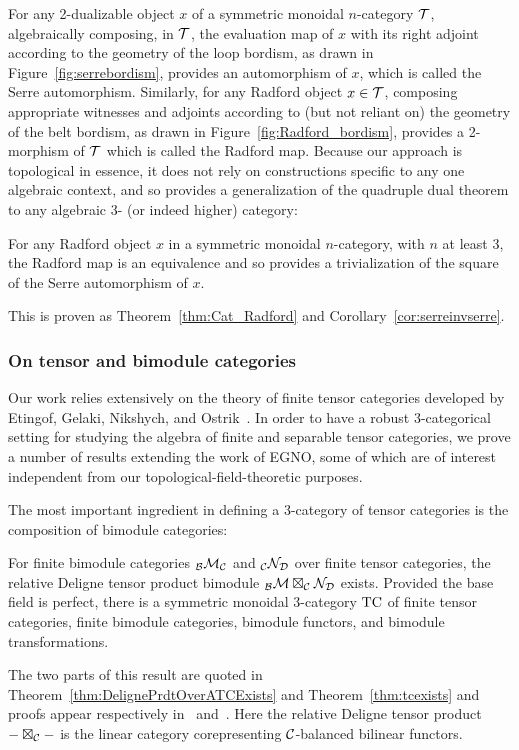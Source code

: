 \documentclass{amsart}
\begin{document}
For any 2-dualizable object $x$ of a symmetric monoidal $n$-category $\mathcal T$, algebraically composing, in $\mathcal T$, the evaluation map of $x$ with its right adjoint according to the geometry of the loop bordism, as drawn in Figure~\ref{fig:serrebordism}, provides an automorphism of $x$, which is called the Serre automorphism.  Similarly, for any Radford object $x \in \mathcal T$, composing appropriate witnesses and adjoints according to (but not reliant on) the geometry of the belt bordism, as drawn in Figure~\ref{fig:Radford_bordism}, provides a 2-morphism of $\mathcal T$ which is called the Radford map.  Because our approach is topological in essence, it does not rely on constructions specific to any one algebraic context, and so provides a generalization of the quadruple dual theorem to any algebraic 3- (or indeed higher) category:
\begin{maintheorem} \label{thm8}
For any Radford object $x$ in a symmetric monoidal $n$-category, with $n$ at least 3, the Radford map is an equivalence and so provides a trivialization of the square of the Serre automorphism of $x$.
\end{maintheorem}
\nid This is proven as Theorem~\ref{thm:Cat_Radford} and Corollary~\ref{cor:serreinvserre}.


\subsubsection{On tensor and bimodule categories}

Our work relies extensively on the theory of finite tensor categories developed by Etingof, Gelaki, Nikshych, and Ostrik~\cite{EGNO, EO-ftc, MR2183279, MR2097289}.  In order to have a robust 3-categorical setting for studying the algebra of finite and separable tensor categories, we prove a number of results extending the work of EGNO, some of which are of interest independent from our topological-field-theoretic purposes.

The most important ingredient in defining a 3-category of tensor categories is the composition of bimodule categories:
\begin{maintheorem} \label{thm9}
For finite bimodule categories ${}_\mathcal B \mathcal M_\mathcal C$ and ${}_\mathcal C \mathcal N_\mathcal D$ over finite tensor categories, the relative Deligne tensor product bimodule ${}_\mathcal B \mathcal M \boxtimes_\mathcal C \mathcal N_\mathcal D$ exists.  Provided the base field is perfect, there is a symmetric monoidal 3-category $\mathrm{TC}$ of finite tensor categories, finite bimodule categories, bimodule functors, and bimodule transformations.
\end{maintheorem}
\nid The two parts of this result are quoted in Theorem~\ref{thm:DelignePrdtOverATCExists} and Theorem~\ref{thm:tcexists} and proofs appear respectively in~\cite{BTP} and~\cite{3TC}.  Here the relative Deligne tensor product $- \boxtimes_\mathcal C -$ is the linear category corepresenting $\mathcal C$-balanced bilinear functors.  
\end{document}
